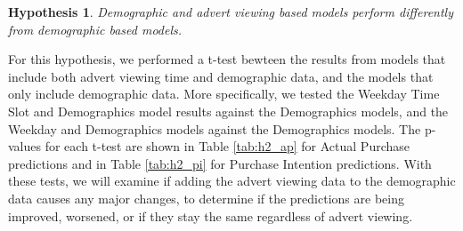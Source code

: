 \documentclass[review]{elsarticle}
\newtheorem{hyp}{Hypothesis}
\begin{document}
\begin{hyp}
\label{hyp:2}
Demographic and advert viewing based models perform differently from demographic based models.
\end{hyp}

For this hypothesis, we performed a t-test bewteen the results from models that include both advert viewing time and demographic data, and the models that only include demographic data. More specifically, we tested the Weekday Time Slot and Demographics model results against the Demographics models, and the Weekday and Demographics models against the Demographics models. The p-values for each t-test are shown in Table \ref{tab:h2_ap} for Actual Purchase predictions and in Table \ref{tab:h2_pi} for Purchase Intention predictions. With these tests, we will examine if adding the advert viewing data to the demographic data causes any major changes, to determine if the predictions are being improved, worsened, or if they stay the same regardless of advert viewing.
\end{document}
